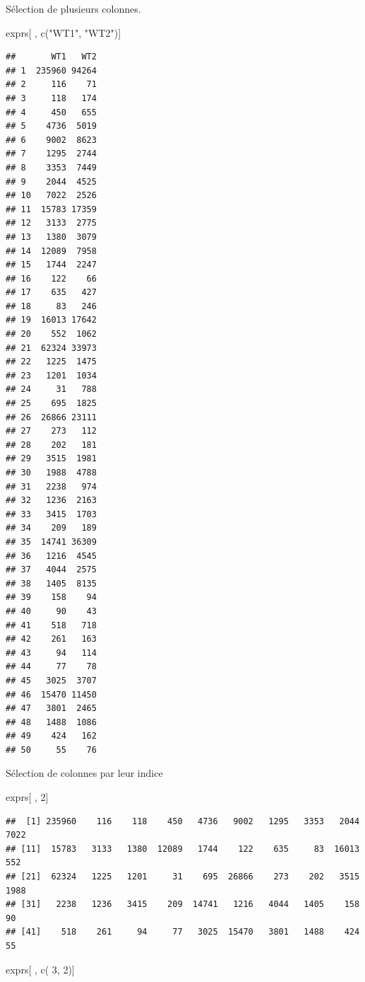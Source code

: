 \documentclass[
]{book}
\newenvironment{Shaded}{\begin{snugshade}}{\end{snugshade}}
\newcommand{\DecValTok}[1]{\textcolor[rgb]{0.00,0.00,0.81}{#1}}
\newcommand{\FunctionTok}[1]{\textcolor[rgb]{0.00,0.00,0.00}{#1}}
\newcommand{\NormalTok}[1]{#1}
\newcommand{\StringTok}[1]{\textcolor[rgb]{0.31,0.60,0.02}{#1}}
\begin{document}
Sélection de plusieurs colonnes.

\begin{Shaded}
\begin{Highlighting}[]
\NormalTok{exprs[ , }\FunctionTok{c}\NormalTok{(}\StringTok{"WT1"}\NormalTok{, }\StringTok{"WT2"}\NormalTok{)]}
\end{Highlighting}
\end{Shaded}

\begin{verbatim}
##       WT1   WT2
## 1  235960 94264
## 2     116    71
## 3     118   174
## 4     450   655
## 5    4736  5019
## 6    9002  8623
## 7    1295  2744
## 8    3353  7449
## 9    2044  4525
## 10   7022  2526
## 11  15783 17359
## 12   3133  2775
## 13   1380  3079
## 14  12089  7958
## 15   1744  2247
## 16    122    66
## 17    635   427
## 18     83   246
## 19  16013 17642
## 20    552  1062
## 21  62324 33973
## 22   1225  1475
## 23   1201  1034
## 24     31   788
## 25    695  1825
## 26  26866 23111
## 27    273   112
## 28    202   181
## 29   3515  1981
## 30   1988  4788
## 31   2238   974
## 32   1236  2163
## 33   3415  1703
## 34    209   189
## 35  14741 36309
## 36   1216  4545
## 37   4044  2575
## 38   1405  8135
## 39    158    94
## 40     90    43
## 41    518   718
## 42    261   163
## 43     94   114
## 44     77    78
## 45   3025  3707
## 46  15470 11450
## 47   3801  2465
## 48   1488  1086
## 49    424   162
## 50     55    76
\end{verbatim}

Sélection de colonnes par leur indice

\begin{Shaded}
\begin{Highlighting}[]
\NormalTok{exprs[ , }\DecValTok{2}\NormalTok{]}
\end{Highlighting}
\end{Shaded}

\begin{verbatim}
##  [1] 235960    116    118    450   4736   9002   1295   3353   2044   7022
## [11]  15783   3133   1380  12089   1744    122    635     83  16013    552
## [21]  62324   1225   1201     31    695  26866    273    202   3515   1988
## [31]   2238   1236   3415    209  14741   1216   4044   1405    158     90
## [41]    518    261     94     77   3025  15470   3801   1488    424     55
\end{verbatim}

\begin{Shaded}
\begin{Highlighting}[]
\NormalTok{exprs[ , }\FunctionTok{c}\NormalTok{( }\DecValTok{3}\NormalTok{, }\DecValTok{2}\NormalTok{)]}
\end{Highlighting}
\end{Shaded}
\end{document}
